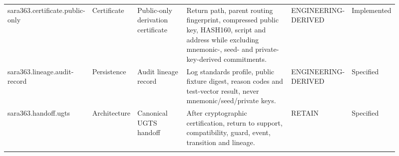 \begin{longtable}{@{}p{0.17\linewidth} p{0.09\linewidth} p{0.15\linewidth} p{0.32\linewidth} p{0.10\linewidth} p{0.08\linewidth}@{}}
\addlinespace[1.5pt]
sara363.certificate.public-only & Certificate & Public-only derivation certificate & Return path, parent routing fingerprint, compressed public key, HASH160, script and address while excluding mnemonic-, seed- and private-key-derived commitments. & ENGINEERING-DERIVED & Implemented\\
\addlinespace[1.5pt]
sara363.lineage.audit-record & Persistence & Audit lineage record & Log standards profile, public fixture digest, reason codes and test-vector result, never mnemonic/seed/private keys. & ENGINEERING-DERIVED & Specified\\
\addlinespace[1.5pt]
sara363.handoff.ugts & Architecture & Canonical UGTS handoff & After cryptographic certification, return to support, compatibility, guard, event, transition and lineage. & RETAIN & Specified\\
\addlinespace[1.5pt]
\bottomrule
\end{longtable}